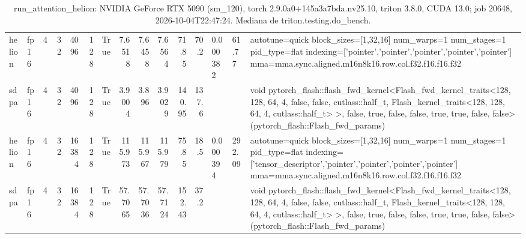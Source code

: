\begin{table}[htbp]
\begin{tabular}{llrrrrlrrrrrlll}
    helion & fp16 & 4 & 32 & 4096 & 128 & True & 7.6518 & 7.6458 & 7.6564 & 71.85 & 70.2 & 0.000382 & 61.77 & autotune=quick block\_sizes=[1,32,16] num\_warps=1 num\_stages=1 pid\_type=flat indexing=['pointer','pointer','pointer','pointer','pointer'] mma=mma.sync.aligned.m16n8k16.row.col.f32.f16.f16.f32 \\
    sdpa & fp16 & 4 & 32 & 4096 & 128 & True & 3.9004 & 3.896 & 3.9029 & 140.95 & 137.6 &  &  & void pytorch\_flash::flash\_fwd\_kernel<Flash\_fwd\_kernel\_traits<128, 128, 64, 4, false, false, cutlass::half\_t, Flash\_kernel\_traits<128, 128, 64, 4, cutlass::half\_t> >, false, true, false, false, true, true, false, false>(pytorch\_flash::Flash\_fwd\_params) \\
    helion & fp16 & 4 & 32 & 16384 & 128 & True & 115.973 & 115.967 & 115.979 & 75.85 & 18.5 & 0.000394 & 292.09 & autotune=quick block\_sizes=[1,32,16] num\_warps=1 num\_stages=1 pid\_type=flat indexing=['tensor\_descriptor','pointer','pointer','pointer','pointer'] mma=mma.sync.aligned.m16n8k16.row.col.f32.f16.f16.f32 \\
    sdpa & fp16 & 4 & 32 & 16384 & 128 & True & 57.7065 & 57.7036 & 57.7124 & 152.43 & 37.2 &  &  & void pytorch\_flash::flash\_fwd\_kernel<Flash\_fwd\_kernel\_traits<128, 128, 64, 4, false, false, cutlass::half\_t, Flash\_kernel\_traits<128, 128, 64, 4, cutlass::half\_t> >, false, true, false, false, true, true, false, false>(pytorch\_flash::Flash\_fwd\_params) \\
    \bottomrule
  \end{tabular}
  \caption{run\_attention\_helion: NVIDIA GeForce RTX 5090 (sm\_120), torch 2.9.0a0+145a3a7bda.nv25.10, triton 3.8.0, CUDA 13.0; job 20648, 2026-10-04T22:47:24. Mediana de triton.testing.do\_bench.}
  \label{tab:pascal-run-attention-helion}
\end{table}
